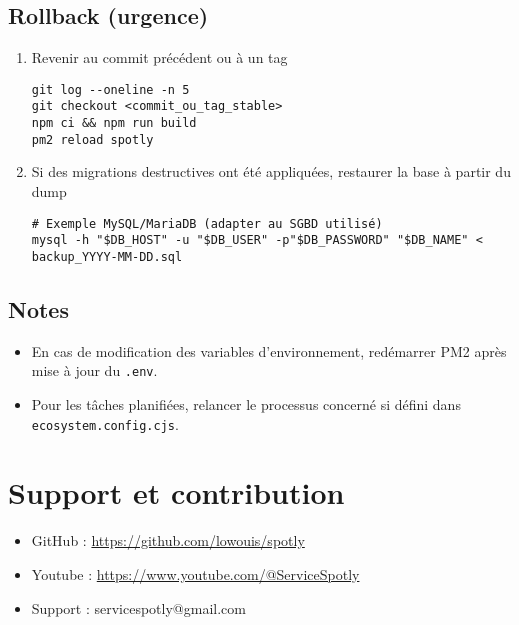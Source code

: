 \documentclass[a4paper,12pt]{article}
\begin{document}
\subsection*{Rollback (urgence)}
\begin{enumerate}
  \item Revenir au commit précédent ou à un tag
\begin{verbatim}
git log --oneline -n 5
git checkout <commit_ou_tag_stable>
npm ci && npm run build
pm2 reload spotly
\end{verbatim}
  \item Si des migrations destructives ont été appliquées, restaurer la base à partir du dump
\begin{verbatim}
# Exemple MySQL/MariaDB (adapter au SGBD utilisé)
mysql -h "$DB_HOST" -u "$DB_USER" -p"$DB_PASSWORD" "$DB_NAME" < backup_YYYY-MM-DD.sql
\end{verbatim}
\end{enumerate}

\subsection*{Notes}
\begin{itemize}
  \item En cas de modification des variables d'environnement, redémarrer PM2 après mise à jour du \texttt{.env}.
  \item Pour les tâches planifiées, relancer le processus concerné si défini dans \texttt{ecosystem.config.cjs}.
\end{itemize}

\newpage

\section{Support et contribution}
\begin{itemize}
    \item GitHub : \url{https://github.com/lowouis/spotly}
        \item Youtube : \url{https://www.youtube.com/@ServiceSpotly}
    \item Support : servicespotly@gmail.com

\end{itemize}
\end{document}
